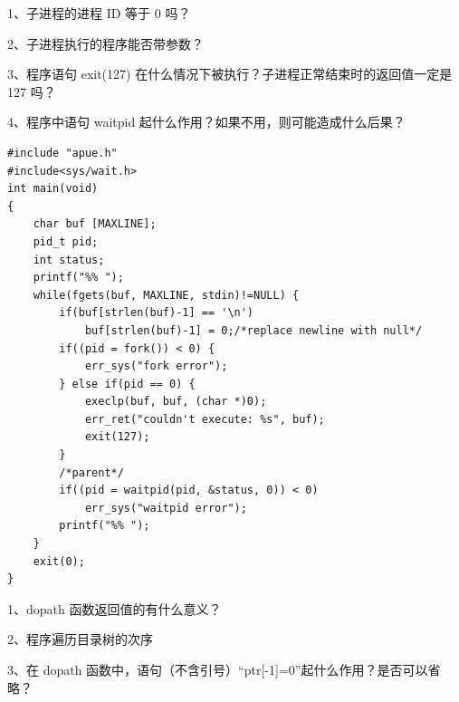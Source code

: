 \documentclass[fontset=exam]{exam-zh}
\begin{document}
1、子进程的进程 ID 等于 0 吗？

2、子进程执行的程序能否带参数？

3、程序语句 exit(127) 在什么情况下被执行？子进程正常结束时的返回值一定是 127 吗？

4、程序中语句 waitpid 起什么作用？如果不用，则可能造成什么后果？

\begin{verbatim}
#include "apue.h"
#include<sys/wait.h>
int main(void)
{
    char buf [MAXLINE];
    pid_t pid;
    int status;
    printf("%% ");
    while(fgets(buf, MAXLINE, stdin)!=NULL) {
        if(buf[strlen(buf)-1] == '\n')
            buf[strlen(buf)-1] = 0;/*replace newline with null*/
        if((pid = fork()) < 0) {
            err_sys("fork error");
        } else if(pid == 0) {
            execlp(buf, buf, (char *)0);
            err_ret("couldn't execute: %s", buf);
            exit(127);
        }
        /*parent*/
        if((pid = waitpid(pid, &status, 0)) < 0)
            err_sys("waitpid error");
        printf("%% ");
    }
    exit(0);
}
\end{verbatim}


\par{}\smallskip

1、dopath 函数返回值的有什么意义？

2、程序遍历目录树的次序

3、在 dopath 函数中，语句（不含引号）``ptr{[}-1{]}=0''起什么作用？是否可以省略？
\end{document}
